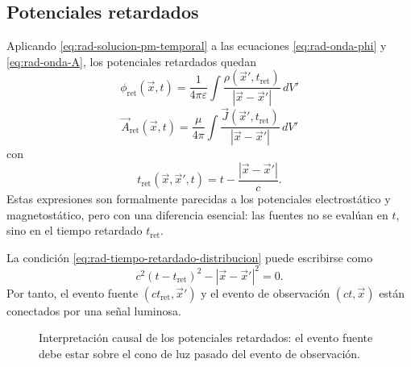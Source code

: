\documentclass[12pt,a4paper]{article}
\theoremstyle{definition}
\theoremstyle{plain}
\numberwithin{equation}{section}
\theoremstyle{remark}
\begin{document}
\subsection{Potenciales retardados}
\label{subsec:potenciales-retardados}

Aplicando \eqref{eq:rad-solucion-pm-temporal} a las ecuaciones \eqref{eq:rad-onda-phi} y \eqref{eq:rad-onda-A}, los potenciales retardados quedan
\begin{equation}
    \boxed{
    \phi_{\mathrm{ret}}(\vec x,t)=
    \frac{1}{4\pi\varepsilon}\int
    \frac{\rho(\vec x',t_{\mathrm{ret}})}{|\vec x-\vec x'|}\,dV'
    }
    \label{eq:rad-potencial-escalar-retardado}
\end{equation}
\begin{equation}
    \boxed{
    \vec A_{\mathrm{ret}}(\vec x,t)=
    \frac{\mu}{4\pi}\int
    \frac{\vec J(\vec x',t_{\mathrm{ret}})}{|\vec x-\vec x'|}\,dV'
    }
    \label{eq:rad-potencial-vectorial-retardado}
\end{equation}
con
\begin{equation}
    \boxed{
    t_{\mathrm{ret}}(\vec x,\vec x',t)=
    t-\frac{|\vec x-\vec x'|}{c}.
    }
    \label{eq:rad-tiempo-retardado-distribucion}
\end{equation}
Estas expresiones son formalmente parecidas a los potenciales electrostático y magnetostático, pero con una diferencia esencial: las fuentes no se evalúan en $t$, sino en el tiempo retardado $t_{\mathrm{ret}}$.

La condición \eqref{eq:rad-tiempo-retardado-distribucion} puede escribirse como
\begin{equation}
    c^2(t-t_{\mathrm{ret}})^2-|\vec x-\vec x'|^2=0.
    \label{eq:rad-relacion-tipo-luz-distribucion}
\end{equation}
Por tanto, el evento fuente $(ct_{\mathrm{ret}},\vec x')$ y el evento de observación $(ct,\vec x)$ están conectados por una señal luminosa.

\begin{figure}[ht!]
\centering
{}
\caption{Interpretación causal de los potenciales retardados: el evento fuente debe estar sobre el cono de luz pasado del evento de observación.}
\label{fig:rad-cono-luz-retardado}
\end{figure}
\end{document}

